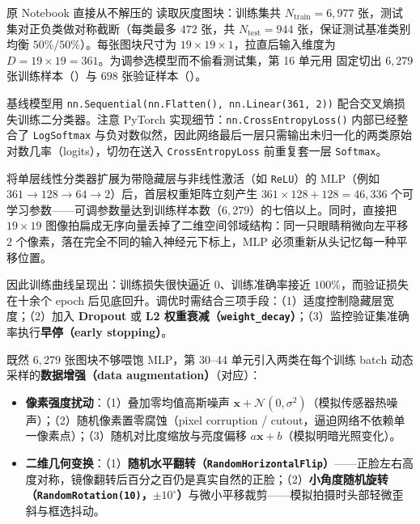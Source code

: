 
原 Notebook 直接从不解压的  读取灰度图块：训练集共 $N_{\mathrm{train}} = 6{,}977$ 张，测试集对正负类做对称截断（每类最多 $472$ 张，共 $N_{\mathrm{test}} = 944$ 张，保证测试基准类别均衡 $50\%/50\%$）。每张图块尺寸为 $19\times 19\times 1$，拉直后输入维度为 $D = 19\times 19 = 361$。为调参选模型而不偷看测试集，第 16 单元用  固定切出 $6{,}279$ 张训练样本（）与 $698$ 张验证样本（）。

基线模型用 \texttt{nn.Sequential(nn.Flatten(), nn.Linear(361, 2))} 配合交叉熵损失训练二分类器。注意 PyTorch 实现细节：\texttt{nn.CrossEntropyLoss()} 内部已经整合了 \texttt{LogSoftmax} 与负对数似然，因此网络最后一层只需输出未归一化的两类原始对数几率（logits），切勿在送入 \texttt{CrossEntropyLoss} 前重复套一层 \texttt{Softmax}。



将单层线性分类器扩展为带隐藏层与非线性激活（如 \texttt{ReLU}）的 MLP（例如 $361 \to 128 \to 64 \to 2$）后，首层权重矩阵立刻产生 $361\times 128 + 128 = 46{,}336$ 个可学习参数——可调参数量达到训练样本数（$6{,}279$）的七倍以上。同时，直接把 $19\times 19$ 图像拍扁成无序向量丢掉了二维空间邻域结构：同一只眼睛稍微向左平移 $2$ 个像素，落在完全不同的输入神经元下标上，MLP 必须重新从头记忆每一种平移位置。

因此训练曲线呈现出：训练损失很快逼近 $0$、训练准确率接近 $100\%$，而验证损失在十余个 epoch 后见底回升。调优时需结合三项手段：（1）适度控制隐藏层宽度；（2）加入 \textbf{Dropout} 或 \textbf{L2 权重衰减（\texttt{weight\_decay}）}；（3）监控验证集准确率执行\textbf{早停（early stopping）}。



既然 $6{,}279$ 张图块不够喂饱 MLP，第 30–44 单元引入两类在每个训练 batch 动态采样的\textbf{数据增强（data augmentation）}（对应）：
\begin{itemize}
\item \textbf{像素强度扰动}：（1）叠加零均值高斯噪声 $\mathbf{x} + \mathcal{N}(0, \sigma^2)$（模拟传感器热噪声）；（2）随机像素置零腐蚀（pixel corruption / cutout，逼迫网络不依赖单一像素点）；（3）随机对比度缩放与亮度偏移 $a\mathbf{x} + b$（模拟明暗光照变化）。
\item \textbf{二维几何变换}：（1）\textbf{随机水平翻转（\texttt{RandomHorizontalFlip}）}——正脸左右高度对称，镜像翻转后百分之百仍是真实自然的正脸；（2）\textbf{小角度随机旋转（\texttt{RandomRotation(10)}，$\pm 10^\circ$）}与微小平移裁剪——模拟拍摄时头部轻微歪斜与框选抖动。
\end{itemize}

